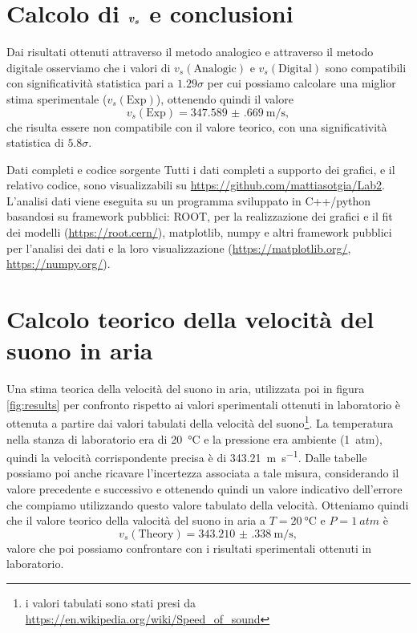 \documentclass[
    rmp,
    reprint, 
    superscriptaddress, 
    altaffilletter, 
    amsmath, 
    amssymb, 
    a4paper,
    varvw]{revtex4-2}
\begin{document}
\iffalse
\fi

\section{Calcolo di $\vb*{v_s}$ e conclusioni}
Dai risultati ottenuti attraverso il metodo analogico e attraverso il metodo digitale osserviamo che i valori di $v_s(\text{Analogic})$ e $v_s(\text{Digital})$ sono compatibili con significatività statistica pari a $1.29\sigma$ per cui possiamo calcolare una miglior stima sperimentale ($v_s(\text{Exp})$), ottenendo quindi il valore \[v_s(\text{Exp}) = \SI{347.589(669)}{\metre\per\second},\] che risulta essere non compatibile con il valore teorico, con una significatività statistica di $5.8\sigma$. 


\begin{methods}{D\lowercase{ati completi e codice sorgente}}
    Tutti i dati completi a supporto dei grafici, e il relativo codice, sono visualizzabili su \url{https://github.com/mattiasotgia/Lab2}. L'analisi dati viene eseguita su un programma sviluppato in C++/python basandosi su framework pubblici: ROOT, per la realizzazione dei grafici e il fit dei modelli (\url{https://root.cern/}), matplotlib, numpy e altri framework pubblici per l'analisi dei dati e la loro visualizzazione (\url{https://matplotlib.org/}, \url{https://numpy.org/}).
\end{methods}

\appendix

\section{Calcolo teorico della velocità del suono in aria}
Una stima teorica della velocità del suono in aria, utilizzata poi in figura \ref{fig:results} per confronto rispetto ai valori sperimentali ottenuti in laboratorio è ottenuta a partire dai valori tabulati della velocità del suono\footnote{i valori tabulati sono stati presi da \url{https://en.wikipedia.org/wiki/Speed_of_sound}}. La temperatura nella stanza di laboratorio era di \SI{20}{\celsius} e la pressione era ambiente (\SI{1}{atm}), quindi la velocità corrispondente precisa è di \SI{343.21}{\metre\per\second}. Dalle tabelle possiamo poi anche ricavare l'incertezza associata a tale misura, considerando il valore precedente e successivo e ottenendo quindi un valore indicativo dell'errore che compiamo utilizzando questo valore tabulato della velocità. Otteniamo quindi che il valore teorico della valocità del suono in aria a $T=\SI{20}{\celsius}$ e $P=\SI{1}{atm}$ è \[v_s(\text{Theory}) = \SI{343.210(338)}{\metre\per\second},\] valore che poi possiamo confrontare con i risultati sperimentali ottenuti in laboratorio. 

\setcounter{table}{0}
\renewcommand{\thetable}{A-\Roman{table}}
\end{document}
